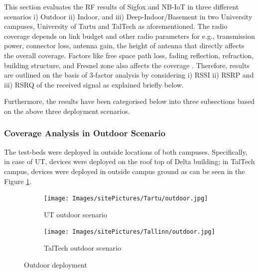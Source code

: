 \documentclass[12pt]{article}
\begin{document}
This section evaluates the RF results of Sigfox and NB-IoT in three different scenarios i) Outdoor ii) Indoor, and iii) Deep-Indoor/Basement in two University campuses, University of Tartu and TalTech as aforementioned. The radio coverage depends on link budget and other radio parameters for e.g., transmission power, connector loss, antenna gain, the height of antenna that directly affects the overall coverage. Factors like free space path loss, fading reflection, refraction, building structure, and Fresnel zone also affects the coverage \cite{sikora2019test,sikora2019performance}. Therefore, results are outlined on the basis of 3-factor analysis by considering i) RSSI ii) RSRP and iii) RSRQ of the received signal as explained briefly below.

Furthermore, the results have been categorised below into three subsections based on the above three deployment scenarios.

\subsubsection{Coverage Analysis in Outdoor Scenario}\label{Outdoor Analysis}

The test-beds were deployed in outside locations of both campuses. Specifically, in case of UT, devices were deployed on the roof top of Delta building; in TalTech campus, devices were deployed in outside campus ground as can be seen in the Figure \ref{fig:Outdoor deployment}.\par



\begin{figure}[H]
\centering
\begin{subfigure}[t]{0.42\linewidth}
  \centering
   \texttt{[image: Images/sitePictures/Tartu/outdoor.jpg]} 
  \caption{UT outdoor scenario}
\end{subfigure}
\begin{subfigure}[t]{0.42\linewidth}
  \centering
  \texttt{[image: Images/sitePictures/Tallinn/outdoor.jpg]} 
  \caption{TalTech outdoor scenario}
\end{subfigure}

\caption{Outdoor deployment}
 \label{fig:Outdoor deployment}
\end{figure}
\end{document}
